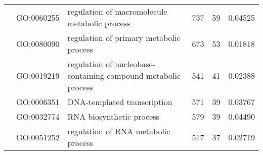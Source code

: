 \begin{landscape}
\begin{longtable}[c]{@{}lllccr@{}}
		\endhead
		\endfoot
		\endlastfoot
		\multirow{21}{*}{\textbf{Bivalvia}}            & GO:0060255                         & regulation of macromolecule metabolic process                             & 737                                                                & 59                                                                   & 0.04525                                                                                  \\
		                                               & GO:0080090                         & regulation of primary metabolic process                                   & 673                                                                & 53                                                                   & 0.01818                                                                                  \\
		                                               & GO:0019219                         & regulation of nucleobase-containing compound metabolic process            & 541                                                                & 41                                                                   & 0.02388                                                                                  \\
		                                               & GO:0006351                         & DNA-templated transcription                                               & 571                                                                & 39                                                                   & 0.03767                                                                                  \\
		                                               & GO:0032774                         & RNA biosynthetic process                                                  & 579                                                                & 39                                                                   & 0.04490                                                                                  \\
		                                               & GO:0051252                         & regulation of RNA metabolic process                                       & 517                                                                & 37                                                                   & 0.02719                                                                                  \\

\end{longtable}
\end{landscape}
